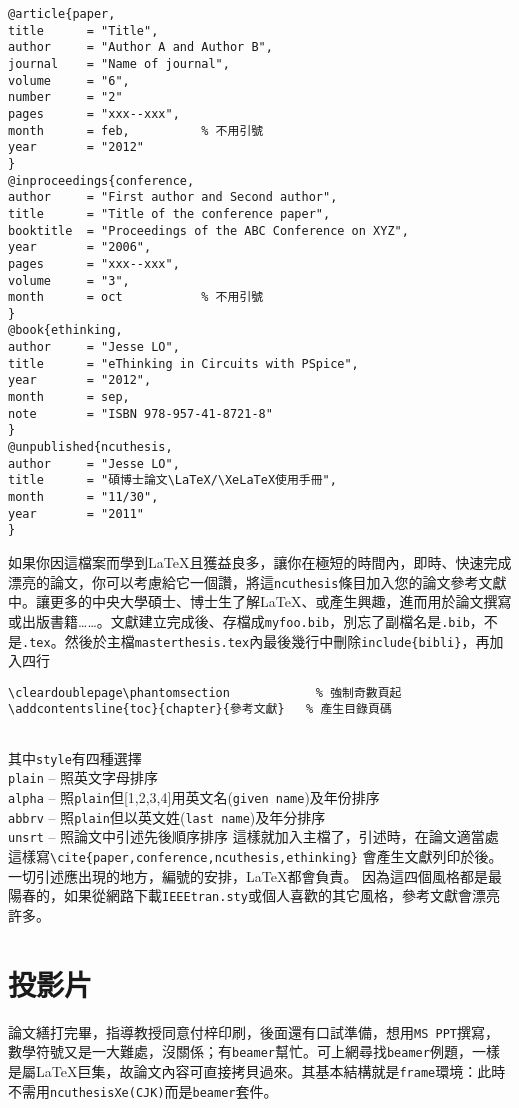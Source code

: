 \begin{Verbatim}[frame=single,firstline=1,lastline=32,rulecolor=\color{red},label=Typing up myfoo.bib]
@article{paper,
title      = "Title",
author     = "Author A and Author B",
journal    = "Name of journal",
volume     = "6",
number     = "2"
pages      = "xxx--xxx",
month      = feb,          % 不用引號
year       = "2012"
}
@inproceedings{conference,
author     = "First author and Second author",
title      = "Title of the conference paper",
booktitle  = "Proceedings of the ABC Conference on XYZ",
year       = "2006",
pages      = "xxx--xxx",
volume     = "3",
month      = oct           % 不用引號
}
@book{ethinking,
author     = "Jesse LO",
title      = "eThinking in Circuits with PSpice",
year       = "2012",
month      = sep,
note       = "ISBN 978-957-41-8721-8"
}
@unpublished{ncuthesis,
author     = "Jesse LO",
title      = "碩博士論文\LaTeX/\XeLaTeX使用手冊",
month      = "11/30",          
year       = "2011"
}
\end{Verbatim}
如果你因這檔案而學到\LaTeX{}且獲益良多，讓你在極短的時間內，即時、快速完成漂亮的論文，你可以考慮給它一個讚，將這{\tt ncuthesis}條目加入您的論文參考文獻中。讓更多的中央大學碩士、博士生了解\LaTeX{}、或產生興趣，進而用於論文撰寫或出版書籍\ldots \ldots。文獻建立完成後、存檔成{\tt myfoo.bib}，別忘了副檔名是{\color{red}\tt .bib}，不是{\color{red}\tt .tex}。然後於主檔{\tt masterthesis.tex}內最後幾行中刪除\verb+include{bibli}+，再加入四行
\begin{Verbatim}[frame=single,rulecolor=\color{red},label=Add this]
\cleardoublepage\phantomsection            % 強制奇數頁起
\addcontentsline{toc}{chapter}{參考文獻}   % 產生目錄頁碼


\end{Verbatim}
其中{\tt style}有四種選擇\\ 
{\tt plain} -- 照英文字母排序\\
{\tt alpha} -- 照{\tt plain}但[1,2,3,4]用英文名({\tt given name})及年份排序\\
{\tt abbrv} -- 照{\tt plain}但以英文姓({\tt last name})及年分排序\\
{\tt unsrt} -- 照論文中引述先後順序排序
這樣就加入主檔了，引述時，在論文適當處這樣寫\verb+\cite{paper,conference,ncuthesis,ethinking}+
會產生文獻列印於後。一切引述應出現的地方，編號的安排，\LaTeX{}都會負責。
因為這四個風格都是最陽春的，如果從網路下載{\tt IEEEtran.sty}或個人喜歡的其它風格，參考文獻會漂亮許多。

\section{投影片}
論文繕打完畢，指導教授同意付梓印刷，後面還有口試準備，想用{\tt MS PPT}撰寫，數學符號又是一大難處，沒關係；有{\tt beamer}幫忙。可上網尋找{\tt beamer}例題，一樣是屬\LaTeX{}巨集，故論文內容可直接拷貝過來。其基本結構就是{\tt frame}環境：此時不需用{\tt ncuthesisXe(CJK)}而是{\tt beamer}套件。

